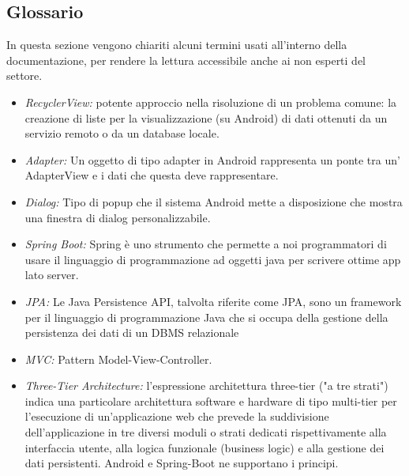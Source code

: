 \subsection{Glossario}
    \begin{flushleft}
        In questa sezione vengono chiariti alcuni termini usati all'interno della documentazione, per rendere la lettura accessibile
        anche ai non esperti del settore.
    \end{flushleft}

    \begin{itemize}
        \item \emph{RecyclerView:} potente approccio nella risoluzione di un problema comune: la creazione di liste per la visualizzazione (su Android) di dati ottenuti da un servizio remoto o da un database locale.
        \item \emph{Adapter:} Un oggetto di tipo adapter in Android rappresenta un ponte tra un' AdapterView e i dati che questa deve rappresentare.
        \item \emph{Dialog:} Tipo di popup che il sistema Android mette a disposizione che mostra una finestra di dialog personalizzabile.
        \item \emph{Spring Boot:} Spring è uno strumento che permette a noi programmatori di usare il linguaggio di programmazione ad oggetti java per scrivere ottime app lato server.
        \item \emph{JPA:} Le Java Persistence API, talvolta riferite come JPA, sono un framework per il linguaggio di programmazione Java che si occupa della gestione della persistenza dei dati di un DBMS relazionale
        \item \emph{MVC:} Pattern Model-View-Controller.
        \item \emph{Three-Tier Architecture:} l'espressione architettura three-tier ("a tre strati") indica una particolare architettura software e hardware di tipo multi-tier per l'esecuzione di un'applicazione web che prevede la suddivisione dell'applicazione in tre diversi 
        moduli o strati dedicati rispettivamente alla interfaccia utente, alla logica funzionale (business logic) e alla gestione dei dati persistenti. Android e Spring-Boot ne supportano i principi.
    \end{itemize}